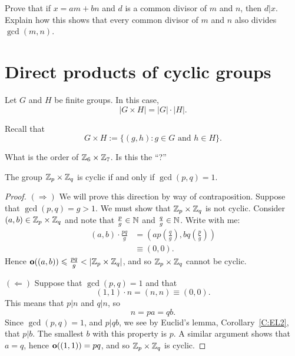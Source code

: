 \documentclass{ximera}
\begin{document}
\begin{exercise} 
Prove that if $x = am +bn$ and $d$ is a common divisor of $m$ and $n$,
then $d|x$. Explain how this shows that every common divisor of $m$
and $n$ also divides $\gcd(m,n)$.
\end{exercise}







\section{Direct products of cyclic groups}


\begin{lemma}
  Let $G$ and $H$ be finite groups. In this case,
  \[
  |G\times H| = |G|\cdot |H|.
  \]
  \begin{sketch}
    Recall that
    \[
    G\times H := \{(g,h): \text{$g\in G$ and $h\in H$}\}.
    \]
  \end{sketch}
\end{lemma}

\begin{exercise}
  What is the order of $\mathbb Z_6\times\mathbb Z_7$. Is this the
  ``?''
\end{exercise}



\begin{theorem}
  The group $\mathbb Z_p\times \mathbb Z_q$ is cyclic if and only if $\gcd(p,q) =
  1$.
  \begin{proof}
    $(\Rightarrow)$ We will prove this direction by way of
    contraposition. Suppose that $\gcd(p,q) = g>1$. We must show that
    $\mathbb Z_p\times \mathbb Z_q$ is not cyclic. Consider $(a,b)\in\mathbb Z_p\times\mathbb Z_q$
    and note that $\frac{p}{g}\in\mathbb N$ and $\frac{q}{g}\in\mathbb N$. Write
    with me:
    \begin{align*}
      (a,b) \cdot \frac{pq}{g} &= \left(ap\left(\frac{q}{g}\right),bq\left(\frac{p}{g}\right)\right)\\
      &\equiv (0,0).
    \end{align*}
    Hence $\mathbf o((a,b)) \leqslant \frac{pq}{g} < |\mathbb Z_p\times\mathbb Z_q|$, and so
    $\mathbb Z_p\times\mathbb Z_q$ cannot be cyclic.

    $(\Leftarrow)$ Suppose that $\gcd(p,q) = 1$ and that
    \[
    (1,1)\cdot n = (n,n) \equiv (0,0).
    \]
    This means that $p|n$ and $q|n$, so
    \[
    n = pa = qb.
    \]
    Since $\gcd(p,q) = 1$, and $p|qb$, we see by Euclid's lemma,
    Corollary~\ref{C:EL2}, that $p|b$. The smallest $b$ with this
    property is $p$. A similar argument shows that $a = q$, hence
    $\mathbf o((1,1)) = pq$, and so $\mathbb Z_p\times\mathbb Z_q$ is cyclic.
  \end{proof}
\end{theorem}
\end{document}
